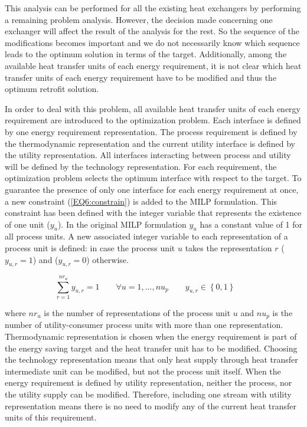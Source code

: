  
This analysis can be performed for all the existing heat exchangers by performing a remaining problem analysis. However, the decision made concerning one exchanger will affect the result of the analysis for the rest. So the sequence of the modifications becomes important and we do not necessarily know which sequence leads to the optimum solution in terms of the target. Additionally, among the available heat transfer units of each energy requirement, it is not clear which heat transfer units of each energy requirement have to be modified and thus the optimum retrofit solution.

In order to deal with this problem, all available heat transfer units of each energy requirement are introduced to the optimization problem. Each interface is defined by one energy requirement representation. The process requirement is defined by the thermodynamic representation and the current utility interface is defined by the utility representation. All interfaces interacting between process and utility will be defined by the technology representation. For each requirement, the optimization problem selects the optimum interface with respect to the target. To guarantee the presence of only one interface for each energy requirement at once, a new constraint (\cref{EQ6:constrain}) is added to the MILP formulation. This constraint has been defined with the integer variable that represents the existence of one unit ($y_{u}$). In the original MILP formulation $y_{u}$ has a constant value of 1 for all process units. A new associated integer variable to each representation of a process unit is defined: in case the process unit $u$ takes the representation $r$ ($y_{u,r}=1$) and ($y_{u,r}=0$) otherwise.

\begin{equation}
\sum_{r=1}^{nr_{u}} y_{u,r}=1  \quad  \quad \forall u=1,...,nu_{p}  \quad \quad  y_{u,r}\in 
\left\{0,1 \right\}  \quad\quad 
\label{EQ6:constrain}
\end{equation} 

 where $nr_{u}$ is the number of representations of the process unit $u$ and $nu_{p}$ is the number of utility-consumer process units with more than one representation. Thermodynamic representation is chosen when the energy requirement is part of the energy saving target and the heat transfer unit has to be modified. Choosing the technology representation means that only heat supply through heat transfer intermediate unit can be modified, but not the process unit itself. When the energy requirement is defined by utility representation, neither the process, nor the utility supply can be modified.  Therefore, including one stream with utility representation means there is no need to modify any of the current heat transfer units of this requirement. 

